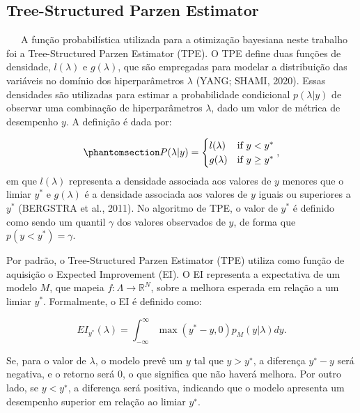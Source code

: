 \documentclass[
  12pt,
  a4paper,
]{scrreprt}
\begin{document}
\subsection{Tree-Structured Parzen
Estimator}\label{tree-structured-parzen-estimator}

~~~A função probabilística utilizada para a otimização bayesiana neste
trabalho foi a Tree-Structured Parzen Estimator (TPE). O TPE define duas
funções de densidade, \(l\left(\lambda\right)\) e
\(g\left(\lambda\right)\), que são empregadas para modelar a
distribuição das variáveis no domínio dos hiperparâmetros \(\lambda\)
(YANG; SHAMI, 2020). Essas densidades são utilizadas para estimar a
probabilidade condicional \(p\left(\lambda | y\right)\) de observar uma
combinação de hiperparâmetros \(\lambda\), dado um valor de métrica de
desempenho \(y\). A definição é dada por:

\begin{equation}\phantomsection\label{eq-tpe}{
P(\lambda|y) =
\begin{cases}
    l(\lambda) & \text{if } y < y^* \\
    g(\lambda) & \text{if } y \ge y^*
\end{cases}\text{,}
}\end{equation} em que \(l\left(\lambda\right)\) representa a densidade
associada aos valores de \(y\) menores que o limiar \(y^*\) e
\(g\left(\lambda\right)\) é a densidade associada aos valores de \(y\)
iguais ou superiores a \(y^*\) (BERGSTRA et al., 2011). No algoritmo de
TPE, o valor de \(y^*\) é definido como sendo um quantil \(\gamma\) dos
valores observados de \(y\), de forma que
\(p\left(y < y^*\right) = \gamma\).

\vspace{12pt}

Por padrão, o Tree-Structured Parzen Estimator (TPE) utiliza como função
de aquisição o Expected Improvement (EI). O EI representa a expectativa
de um modelo \(M\), que mapeia \(f:\Lambda \rightarrow \mathbb{R}^N\),
sobre a melhora esperada em relação a um limiar \(y^*\). Formalmente, o
EI é definido como:

\[
EI_{y^*}\left(\lambda\right) = \int_{-\infty}^{\infty} \max\left(y^* - y, 0\right)p_{M}\left(y|\lambda\right)dy\text{.}
\]

Se, para o valor de \(\lambda\), o modelo prevê um \(y\) tal que
\(y > y^∗\), a diferença \(y^∗ − y\) será negativa, e o retorno será 0,
o que significa que não haverá melhora. Por outro lado, se \(y < y^∗\),
a diferença será positiva, indicando que o modelo apresenta um
desempenho superior em relação ao limiar \(y^∗\).
\end{document}
